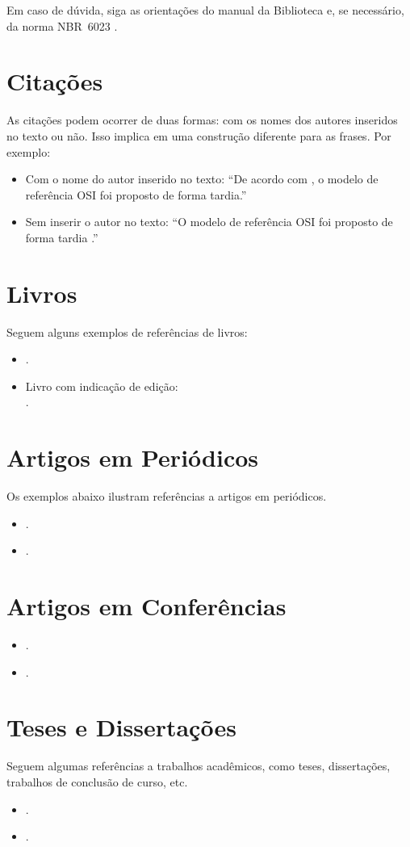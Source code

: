 Em caso de dúvida, siga as orientações do manual da Biblioteca \cite{Biblioteca11} e, se necessário, da norma NBR~6023 \cite{NBR6023:2002}.

\section{Citações}
As citações podem ocorrer de duas formas: com os nomes dos autores inseridos no texto ou não.  Isso implica em uma construção diferente para as frases.  Por exemplo:
\begin{itemize}
	\item Com o nome do autor inserido no texto: ``De acordo com , o modelo de referência OSI foi proposto de forma tardia.''
	\item Sem inserir o autor no texto: ``O modelo de referência OSI foi proposto de forma tardia \cite{Tanenbaum03}.''
\end{itemize}

\section{Livros}
Seguem alguns exemplos de referências de livros:
\begin{itemize}
	\item {}.
	\item Livro com indicação de edição:\\
	.
\end{itemize}

\section{Artigos em Periódicos}
Os exemplos abaixo ilustram referências a artigos em periódicos.
\begin{itemize}
	\item {}.
	\item {}.
\end{itemize}

\section{Artigos em Conferências}
\begin{itemize}
	\item {}.
	\item {}.
\end{itemize}

\section{Teses e Dissertações}
Seguem algumas referências a trabalhos acadêmicos, como teses, dissertações, trabalhos de conclusão de curso, etc.
\begin{itemize}
	\item {}.
	\item {}.
\end{itemize}